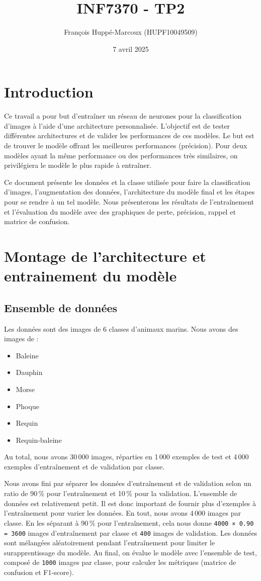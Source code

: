 \documentclass{article}
\title{INF7370 - TP2}
\author{François Huppé-Marcoux (HUPF10049509)}
\date{7 avril 2025}
\begin{document}
\maketitle

\section{Introduction}

Ce travail a pour but d'entraîner un réseau de neurones pour la classification d'images à l'aide d'une architecture personnalisée. L'objectif est de tester différentes architectures et de valider les performances de ces modèles. Le but est de trouver le modèle offrant les meilleures performances (précision). Pour deux modèles ayant la même performance ou des performances très similaires, on privilégiera le modèle le plus rapide à entraîner.

Ce document présente les données et la classe utilisée pour faire la classification d'images, l'augmentation des données, l'architecture du modèle final et les étapes pour se rendre à un tel modèle. Nous présenterons les résultats de l'entraînement et l'évaluation du modèle avec des graphiques de perte, précision, rappel et matrice de confusion.

\section{ Montage de l’architecture et entrainement du modèle}

\subsection{ Ensemble de données}

Les données sont des images de 6 classes d'animaux marins. Nous avons des images de :
\begin{itemize}
    \item Baleine
    \item Dauphin
    \item Morse
    \item Phoque
    \item Requin
    \item Requin-baleine
\end{itemize}

Au total, nous avons 30\,000 images, réparties en 1\,000 exemples de test et 4\,000 exemples d'entraînement et de validation par classe.

Nous avons fini par séparer les données d'entraînement et de validation selon un ratio de 90\,\% pour l'entraînement et 10\,\% pour la validation. L'ensemble de données est relativement petit. Il est donc important de fournir plus d'exemples à l'entraînement pour varier les données.
En tout, nous avons 4\,000 images par classe. En les séparant à 90\,\% pour l'entraînement, cela nous donne \texttt{4000 × 0.90 = 3600} images d'entraînement par classe et \texttt{400} images de validation. Les données sont mélangées aléatoirement pendant l'entraînement pour limiter le surapprentissage du modèle.
Au final, on évalue le modèle avec l'ensemble de test, composé de \texttt{1000} images par classe, pour calculer les métriques (matrice de confusion et F1-score).
\end{document}
